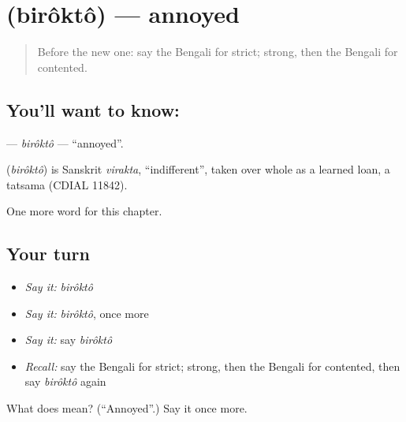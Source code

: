 \section[\texorpdfstring{\bn{বিরক্ত} (birôktô)}{বিরক্ত (birôktô)}]{ (birôktô) — annoyed}

\label{lesson:BN-C161-birokto}



\begin{quote}
Before the new one: say the Bengali for strict; strong, then the Bengali for contented.
\end{quote}

\subsection*{You'll want to know: }
\textbf{} — \emph{birôktô} — \textquotedblleft{}annoyed\textquotedblright{}.

\begin{cousinweb}
\textbf{} (\emph{birôktô}) is Sanskrit \emph{virakta}, \textquotedblleft{}indifferent\textquotedblright{}, taken over whole as a learned loan, a tatsama (CDIAL 11842).
\end{cousinweb}

\begin{grammarlens}[title={What you've built}]
One more word for this chapter.
\end{grammarlens}

\subsection*{Your turn}
\begin{itemize}
\raggedright
  \item \emph{Say it:} \emph{birôktô}
  \item \emph{Say it:} \emph{birôktô}, once more
  \item \emph{Say it:} say \emph{birôktô}
  \item \emph{Recall:} say the Bengali for strict; strong, then the Bengali for contented, then say \emph{birôktô} again
\end{itemize}

\begin{tcolorbox}[breakable,colback=teal!4,colframe=teal!35!black,title={Before you move on}]
What does  mean? (\textquotedblleft{}Annoyed\textquotedblright{}.) Say it once more.
\end{tcolorbox}
